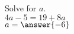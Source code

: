 \documentclass{ximera}
\author{David Kish}
\begin{document}
\begin{exercise}
Solve for $a$.\\
$4a-5=19+8a$\\
$a=\answer{-6}$
\end{exercise}
\end{document}
